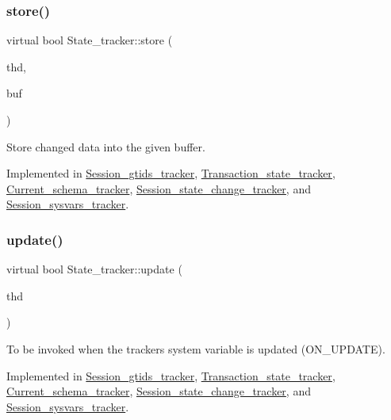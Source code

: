 \subsubsection{\texorpdfstring{store()}{store()}}
{\footnotesize\ttfamily virtual bool State\+\_\+tracker\+::store (\begin{DoxyParamCaption}\item[{T\+HD $\ast$}]{thd,  }\item[{String \&}]{buf }\end{DoxyParamCaption})\hspace{0.3cm}{\ttfamily [pure virtual]}}

Store changed data into the given buffer. 

Implemented in \mbox{\hyperlink{classSession__gtids__tracker_a35a83c4f0631294a76d707c20d5f1e1f}{Session\+\_\+gtids\+\_\+tracker}}, \mbox{\hyperlink{classTransaction__state__tracker_a7f7843e53238fdc98ee31ac07b2376e2}{Transaction\+\_\+state\+\_\+tracker}}, \mbox{\hyperlink{classCurrent__schema__tracker_a9d33638a5c4db24bb480f9aa0e202edb}{Current\+\_\+schema\+\_\+tracker}}, \mbox{\hyperlink{classSession__state__change__tracker_abd748697d89b7c7146b64438db0b404e}{Session\+\_\+state\+\_\+change\+\_\+tracker}}, and \mbox{\hyperlink{classSession__sysvars__tracker_a518ef2f3fae3c779cf182a391683b22e}{Session\+\_\+sysvars\+\_\+tracker}}.

\mbox{\label{classState__tracker_a74ffdcb79733e8d31e9fe2dcae346022}} 
\subsubsection{\texorpdfstring{update()}{update()}}
{\footnotesize\ttfamily virtual bool State\+\_\+tracker\+::update (\begin{DoxyParamCaption}\item[{T\+HD $\ast$}]{thd }\end{DoxyParamCaption})\hspace{0.3cm}{\ttfamily [pure virtual]}}

To be invoked when the tracker\textquotesingle{}s system variable is updated (O\+N\+\_\+\+U\+P\+D\+A\+TE). 

Implemented in \mbox{\hyperlink{classSession__gtids__tracker_a02f3fb9545c5dfbedb9022f55ce03e6c}{Session\+\_\+gtids\+\_\+tracker}}, \mbox{\hyperlink{classTransaction__state__tracker_a96e814f8253741480125787405add62a}{Transaction\+\_\+state\+\_\+tracker}}, \mbox{\hyperlink{classCurrent__schema__tracker_a087a504d0c2ff939acecf08c891d3725}{Current\+\_\+schema\+\_\+tracker}}, \mbox{\hyperlink{classSession__state__change__tracker_abab633a67ce00f87c65059317242eb6c}{Session\+\_\+state\+\_\+change\+\_\+tracker}}, and \mbox{\hyperlink{classSession__sysvars__tracker_a82607e850253dec7382bc49425179074}{Session\+\_\+sysvars\+\_\+tracker}}.



